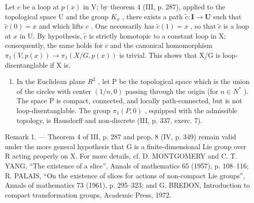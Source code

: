 Let \(c\) be a loop at \(p(x)\) in V; by theorem 4 (III, p. 287), applied to the topological space U and the group \(K_x\) , there exists a path \(\widetilde{c} \colon \mathbf{I} \to \mathbf{U}\) such that \(\widetilde{c}(0) = x\) and which lifts \(c\) . One necessarily has \(\widetilde{c}(1) = x\) , so that \(\widetilde{c}\) is a loop at \(x\) in U. By hypothesis, \(\widetilde{c}\) is strictly homotopic to a constant loop in X; consequently, the same holds for \(c\) and the canonical homomorphism \(\pi_1(V, p(x)) \to \pi_1(X/G, p(x))\) is trivial. This shows that X/G is loop-disentanglable if X is.

\begin{enumerate}
\def\labelenumi{\arabic{enumi})}
\setcounter{enumi}{4}
\tightlist
\item
  In the Euclidean plane \(R^{2}\) , let P be the topological space which is the union of the circles with center \((1/n,0)\) passing through the origin (for \(n \in N^{*}\) ). The space P is compact, connected, and locally path-connected, but is not loop-disentanglable. The group \(\pi_{1}(P,0)\) , equipped with the admissible topology, is Hausdorff and non-discrete (III, p. 337, exerc. 7).
\end{enumerate}

Remark 1. --- Theorem 4 of III, p. 287 and prop. 8 (IV, p. 349) remain valid under the more general hypothesis that G is a finite-dimensional Lie group over R acting properly on X. For more details, cf. D. MONTGOMERY and C. T. YANG, “The existence of a slice”, Annals of mathematics 65 (1957), p. 108--116; R. PALAIS, “On the existence of slices for actions of non-compact Lie groups”, Annals of mathematics 73 (1961), p. 295--323; and G. BREDON, Introduction to compact transformation groups, Academic Press, 1972.


